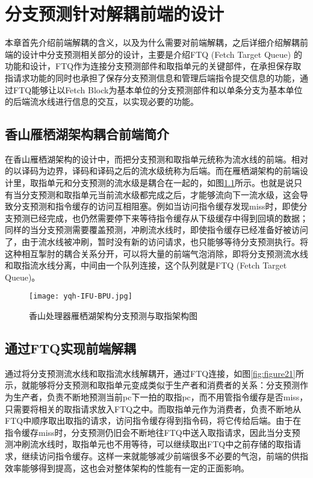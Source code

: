 \chapter{分支预测针对解耦前端的设计}

本章首先介绍前端解耦的含义，以及为什么需要对前端解耦，之后详细介绍解耦前端的设计中分支预测相关部分的设计，主要是介绍FTQ (Fetch Target Queue) 的功能和设计，FTQ作为连接分支预测部件和取指单元的关键部件，在承担保存取指请求功能的同时也承担了保存分支预测信息和管理后端指令提交信息的功能，通过FTQ能够让以Fetch Block为基本单位的分支预测部件和以单条分支为基本单位的后端流水线进行信息的交互，以实现必要的功能。

\section{香山雁栖湖架构耦合前端简介}


在香山雁栖湖架构的设计中，而把分支预测和取指单元统称为流水线的前端。相对的以译码为边界，译码和译码之后的流水级统称为后端。而在雁栖湖架构的前端设计里，取指单元和分支预测的流水级是耦合在一起的，如图\ref{fig:figure41}所示。也就是说只有当分支预测和取指单元当前流水级都完成之后，才能够流向下一流水级，这会导致分支预测和指令缓存的访问互相阻塞。例如当访问指令缓存发现miss时，即使分支预测已经完成，也仍然需要停下来等待指令缓存从下级缓存中得到回填的数据；同样的当分支预测需要覆盖预测，冲刷流水线时，即使指令缓存已经准备好被访问了，由于流水线被冲刷，暂时没有新的访问请求，也只能够等待分支预测执行。将这种相互掣肘的耦合关系分开，可以将大量的前端气泡消除，即将分支预测流水线和取指流水线分离，中间由一个队列连接，这个队列就是FTQ (Fetch Target Queue)。

\begin{figure}[htb]
	\centering
	\setlength\tabcolsep{3pt}  %
	\vspace{5pt} %
	\texttt{[image: yqh-IFU-BPU.jpg]}
	\caption{香山处理器雁栖湖架构分支预测与取指架构图}
    \label{fig:figure41}
\end{figure}

\section{通过FTQ实现前端解耦}

通过将分支预测流水线和取指流水线解耦开，通过FTQ连接，如图\ref{fig:figure21}所示，就能够将分支预测和取指单元变成类似于生产者和消费者的关系：分支预测作为生产者，负责不断地预测当前pc下一拍的取指pc，而不用管指令缓存是否miss，只需要将相关的取指请求放入FTQ之中。而取指单元作为消费者，负责不断地从FTQ中顺序取出取指的请求，访问指令缓存得到指令码，将它传给后端。由于在指令缓存miss时，分支预测仍旧会不断地往FTQ中送入取指请求，因此当分支预测冲刷流水线时，取指单元也不用等待，可以继续取出FTQ中之前存储的取指请求，继续访问指令缓存。这样一来就能够减少前端很多不必要的气泡，前端的供指效率能够得到提高，这也会对整体架构的性能有一定的正面影响。

